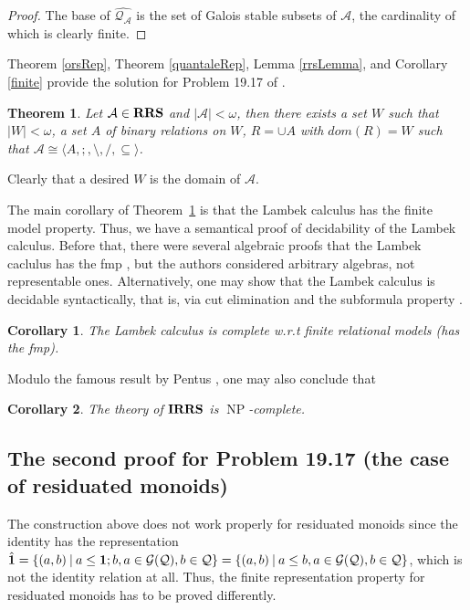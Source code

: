 \documentclass[a4paper]{article}
\theoremstyle{defin}
\theoremstyle{theorem}
\newtheorem{theorem}{Theorem}
\theoremstyle{prop}
\theoremstyle{lemma}
\theoremstyle{ex}
\theoremstyle{col}
\newtheorem{col}{Corollary}
\theoremstyle{claim}
\begin{document}
\begin{proof}
  The base of $\widehat{\mathcal{Q}_{\mathcal{A}}}$ is the set of Galois stable subsets of $\mathcal{A}$, the cardinality of which is clearly finite.
\end{proof}


Theorem \ref{orsRep}, Theorem \ref{quantaleRep}, Lemma \ref{rrsLemma}, and Corollary \ref{finite} provide the solution for Problem 19.17 of \cite{hirsch2002relation}.
\begin{theorem} \label{solution}
  Let $\mathcal{A} \in {\bf RRS}$ and $|\mathcal{A}| < \omega$, then there exists a set $W$ such that $|W| < \omega$, a set $A$ of binary relations on $W$, $R = \cup A$ with $dom(R) = W$ such that
  $\mathcal{A} \cong \langle A, ;, \setminus, /, \subseteq \rangle$.
\end{theorem}
Clearly that a desired $W$ is the domain of $\mathcal{A}$.

The main corollary of Theorem~\ref{solution} is that the Lambek calculus has the finite model property. Thus, we have a semantical proof of decidability of the Lambek calculus. Before that, there were several algebraic proofs that the Lambek caclulus has the fmp \cite{buszkowski2008infinitary}, but the authors considered arbitrary algebras, not representable ones.
Alternatively, one may show that the Lambek calculus is decidable syntactically, that is, via cut elimination and the subformula property \cite{lambek1958mathematics}.
\begin{col}
  The Lambek calculus is complete w.r.t finite relational models (has the fmp).
\end{col}

Modulo the famous result by Pentus \cite{pentus2006lambek}, one may also conclude that

\begin{col}
  The theory of ${\bf IRRS}$ is $\operatorname{NP}$-complete.
\end{col}

\subsection{The second proof for Problem 19.17 (the case of residuated monoids)}

The construction above does not work properly for residuated monoids since the identity has the representation $\hat{{\bf 1}} = \{ (a,b) \: | \: a \leq {\bf 1} ; b, a \in \mathcal{G}(\mathcal{Q}), b \in \mathcal{Q}\} = \{ (a,b) \: | \: a \leq b, a \in \mathcal{G}(\mathcal{Q}), b \in \mathcal{Q}\}$, which is not the identity relation at all. Thus, the finite representation property for residuated monoids has to be proved differently.
\end{document}
